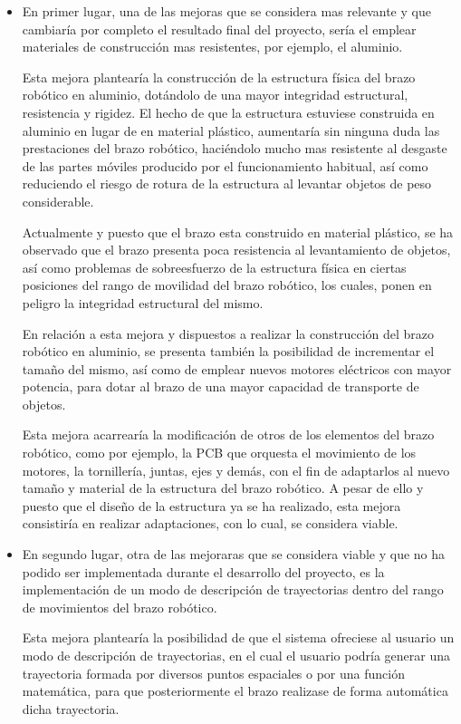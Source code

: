 \begin{itemize}
    \item En primer lugar, una de las mejoras que se considera mas relevante y que cambiaría por completo el resultado final del proyecto, sería el emplear materiales de construcción mas resistentes, por ejemplo, el aluminio.
    
    Esta mejora plantearía la construcción de la estructura física del brazo robótico en aluminio, dotándolo de una mayor integridad estructural, resistencia y rigidez. El hecho de que la estructura estuviese construida en aluminio en lugar de en material plástico, aumentaría sin ninguna duda las prestaciones del brazo robótico, haciéndolo mucho mas resistente al desgaste de las partes móviles producido por el funcionamiento habitual, así como reduciendo el riesgo de rotura de la estructura al levantar objetos de peso considerable.
    
    Actualmente y puesto que el brazo esta construido en material plástico, se ha observado que el brazo presenta poca resistencia al levantamiento de objetos, así como problemas de sobreesfuerzo de la estructura física en ciertas posiciones del rango de movilidad del brazo robótico, los cuales, ponen en peligro la integridad estructural del mismo.
    
    En relación a esta mejora y dispuestos a realizar la construcción del brazo robótico en aluminio, se presenta también la posibilidad de incrementar el tamaño del mismo, así como de emplear nuevos motores eléctricos con mayor potencia, para dotar al brazo de una mayor capacidad de transporte de objetos.
    
    Esta mejora acarrearía la modificación de otros de los elementos del brazo robótico, como por ejemplo, la PCB que orquesta el movimiento de los motores, la tornillería, juntas, ejes y demás, con el fin de adaptarlos al nuevo tamaño y material de la estructura del brazo robótico. A pesar de ello y puesto que el diseño de la estructura ya se ha realizado, esta mejora consistiría en realizar adaptaciones, con lo cual, se considera viable.
    
    \item En segundo lugar, otra de las mejoraras que se considera viable y que no ha podido ser implementada durante el desarrollo del proyecto, es la implementación de un modo de descripción de trayectorias dentro del rango de movimientos del brazo robótico.
    
    Esta mejora plantearía la posibilidad de que el sistema ofreciese al usuario un modo de descripción de trayectorias, en el cual el usuario podría generar una trayectoria formada por diversos puntos espaciales o por una función matemática, para que posteriormente el brazo realizase de forma automática dicha trayectoria.
    

\end{itemize}
